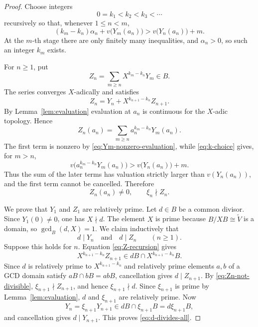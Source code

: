\documentclass[12pt]{amsart}
\theoremstyle{plain}
\begin{document}
\begin{proof}
Choose integers
\[
  0=k_1<k_2<k_3<\cdots
\]
recursively so that, whenever $1\leq n<m$,
\begin{equation}\label{eq:k-choice}
  (k_m-k_n)\alpha_n+v\bigl(Y_m(a_n)\bigr)
  >v\bigl(Y_n(a_n)\bigr)+m.
\end{equation}
At the $m$-th stage there are only finitely many inequalities, and
$\alpha_n>0$, so such an integer $k_m$ exists.

For $n\geq1$, put
\begin{equation}\label{eq:Zn}
  Z_n=\sum_{m\geq n}X^{k_m-k_n}Y_m\in B.
\end{equation}
The series converges $X$-adically and satisfies
\begin{equation}\label{eq:Z-recursion}
  Z_n=Y_n+X^{k_{n+1}-k_n}Z_{n+1}.
\end{equation}
By Lemma~\ref{lem:evaluation} evaluation at $a_n$ is continuous for
the $X$-adic topology.  Hence
\[
  Z_n(a_n)=\sum_{m\geq n}a_n^{k_m-k_n}Y_m(a_n).
\]
The first term is nonzero by
\eqref{eq:Ym-nonzero-evaluation}, while
\eqref{eq:k-choice} gives, for $m>n$,
\[
  v\bigl(a_n^{k_m-k_n}Y_m(a_n)\bigr)
  >v\bigl(Y_n(a_n)\bigr)+m.
\]
Thus the sum of the later terms has valuation strictly larger than
$v(Y_n(a_n))$, and the first term cannot be cancelled.  Therefore
\begin{equation}\label{eq:Zn-not-divisible}
  Z_n(a_n)\neq0,
  \qquad
  \xi_n\nmid Z_n.
\end{equation}

We prove that $Y_1$ and $Z_1$ are relatively prime.  Let $d\in B$ be a
common divisor.  Since $Y_1(0)\neq0$, one has $X\nmid d$.  The element
$X$ is prime because $B/XB\cong\widetilde V$ is a domain, so
$\gcd_B(d,X)=1$.  We claim inductively that
\begin{equation}\label{eq:d-divides-all}
  d\mid Y_n
  \quad\text{and}\quad
  d\mid Z_n
  \qquad(n\geq1).
\end{equation}
Suppose this holds for $n$.  Equation \eqref{eq:Z-recursion} gives
\[
  X^{k_{n+1}-k_n}Z_{n+1}\in dB\cap X^{k_{n+1}-k_n}B.
\]
Since $d$ is relatively prime to $X^{k_{n+1}-k_n}$ and relatively
prime elements $a,b$ of a GCD domain satisfy $aB\cap bB=abB$,
cancellation gives $d\mid Z_{n+1}$.  By
\eqref{eq:Zn-not-divisible}, $\xi_{n+1}\nmid Z_{n+1}$, and hence
$\xi_{n+1}\nmid d$.  Since $\xi_{n+1}$ is prime by
Lemma~\ref{lem:evaluation}, $d$ and $\xi_{n+1}$ are relatively prime.
Now
\[
  Y_n=\xi_{n+1}Y_{n+1}\in dB\cap\xi_{n+1}B
  =d\xi_{n+1}B,
\]
and cancellation gives $d\mid Y_{n+1}$.  This proves
\eqref{eq:d-divides-all}.


\end{proof}
\end{document}
